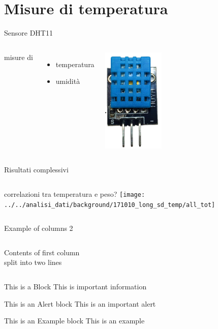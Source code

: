 \documentclass{beamer}
\begin{document}
\section{Misure di temperatura}
\begin{frame}{Sensore DHT11}
  \begin{columns}[c] 
      misure di 
      \begin{itemize}
        \item temperatura
        \item umidit\`a
      \end{itemize}
      \includegraphics[height=5cm]{../Foto/DHT11}
   \end{columns}
\end{frame}
\begin{frame}{Risultati complessivi}
  \begin{columns}[c] 
      correlazioni tra temperatura e peso?
      \texttt{[image: ../../analisi\_dati/background/171010\_long\_sd\_temp/all\_tot]}   
   \end{columns}
\end{frame}





\begin{frame}{Example of columns 2}
\begin{columns}[T] %
\begin{column}[T]{5cm} %
Contents of first column \\ split into two lines
\end{column}
\begin{column}[T]{5cm} %
\end{column}
\end{columns}
\end{frame}

\begin{frame}

\begin{block}{This is a Block}
This is important information
\end{block}

\begin{alertblock}{This is an Alert block}
This is an important alert
\end{alertblock}

\begin{exampleblock}{This is an Example block}
This is an example 
\end{exampleblock}

\end{frame}
\end{document}
